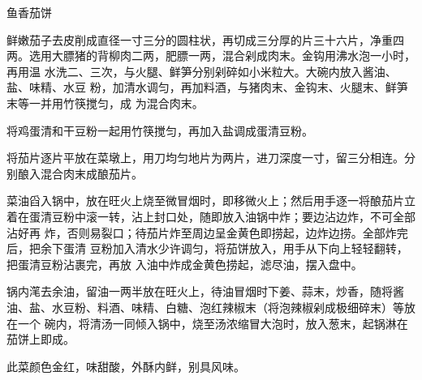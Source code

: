 \begin{recipe}{鱼香茄饼}

\ingredients


\preparation

\step 鲜嫩茄子去皮削成直径一寸三分的圆柱状，再切成三分厚的片三十六片，净重四
两。选用大膘猪的背柳肉二两，肥膘一两，混合剁成肉末。金钩用沸水泡一小时，再用温
水洗二、三次，与火腿、鲜笋分别剁碎如小米粒大。大碗内放入酱油、盐、味精、水豆
粉，加清水调匀，再加料酒，与猪肉末、金钩末、火腿末、鲜笋末等一并用竹筷搅匀，成
为混合肉末。

\step 将鸡蛋清和干豆粉一起用竹筷搅匀，再加入盐调成蛋清豆粉。

\step 将茄片逐片平放在菜墩上，用刀均匀地片为两片，进刀深度一寸，留三分相连。分
别酿入混合肉末成酿茄片。

\step 菜油舀入锅中，放在旺火上烧至微冒烟时，即移微火上；然后用手逐一将酿茄片立
着在蛋清豆粉中滚一转，沾上封口处，随即放入油锅中炸；要边沾边炸，不可全部沾好再
炸，否则易裂口；待茄片炸至周边呈金黄色即捞起，边炸边捞。全部炸完后，把余下蛋清
豆粉加入清水少许调匀，将茄饼放入，用手从下向上轻轻翻转，把蛋清豆粉沾裹完，再放
入油中炸成金黄色捞起，滤尽油，摆入盘中。

\step 锅内滗去余油，留油一两半放在旺火上，待油冒烟时下姜、蒜末，炒香，随将酱
油、盐、水豆粉、料酒、味精、白糖、泡红辣椒末（将泡辣椒剁成极细碎末）等放在一个
碗内，将清汤一同倾入锅中，烧至汤浓缩冒大泡时，放入葱末，起锅淋在茄饼上即成。

\features

此菜颜色金红，味甜酸，外酥内鲜，别具风味。

\end{recipe}

